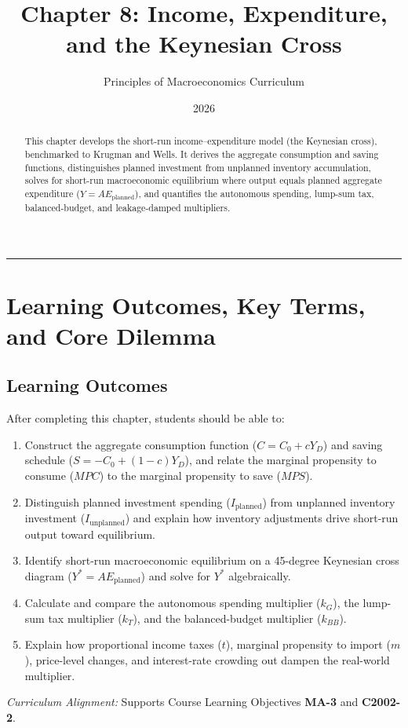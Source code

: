 \documentclass[11pt,letterpaper]{article}
\begin{document}
\title{\Huge\bfseries\color{SlateBlue} Chapter 8: Income, Expenditure, and the Keynesian Cross}
\author{\large Principles of Macroeconomics Curriculum}
\date{2026}
\maketitle

\thispagestyle{plain}

\begin{abstract}
This chapter develops the short-run income--expenditure model (the Keynesian cross), benchmarked to Krugman and Wells. It derives the aggregate consumption and saving functions, distinguishes planned investment from unplanned inventory accumulation, solves for short-run macroeconomic equilibrium where output equals planned aggregate expenditure ($Y = AE_{\text{planned}}$), and quantifies the autonomous spending, lump-sum tax, balanced-budget, and leakage-damped multipliers.
\end{abstract}

\tableofcontents
\vspace{1.5em}
\hrule
\vspace{1.5em}

\section{Learning Outcomes, Key Terms, and Core Dilemma}

\subsection*{Learning Outcomes}
After completing this chapter, students should be able to:
\begin{enumerate}
    \item Construct the aggregate consumption function ($C = C_0 + cY_D$) and saving schedule ($S = -C_0 + (1-c)Y_D$), and relate the marginal propensity to consume ($MPC$) to the marginal propensity to save ($MPS$).
    \item Distinguish planned investment spending ($I_{\text{planned}}$) from unplanned inventory investment ($I_{\text{unplanned}}$) and explain how inventory adjustments drive short-run output toward equilibrium.
    \item Identify short-run macroeconomic equilibrium on a 45-degree Keynesian cross diagram ($Y^* = AE_{\text{planned}}$) and solve for $Y^*$ algebraically.
    \item Calculate and compare the autonomous spending multiplier ($k_G$), the lump-sum tax multiplier ($k_T$), and the balanced-budget multiplier ($k_{BB}$).
    \item Explain how proportional income taxes ($t$), marginal propensity to import ($m$), price-level changes, and interest-rate crowding out dampen the real-world multiplier.
\end{enumerate}
\noindent\textit{Curriculum Alignment:} Supports Course Learning Objectives \textbf{MA-3} and \textbf{C2002-2}.
\end{document}
